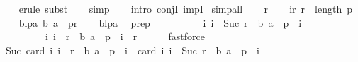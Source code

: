 \begin{isabellebody}
\ \ \isamarkupfalse%
\ {\isacharparenleft}{\kern0pt}erule\ subst{\isacharparenright}{\kern0pt}\isanewline
\ \ \isamarkupfalse%
\ {\isacharparenleft}{\kern0pt}simp{\isacharparenright}{\kern0pt}\isanewline
\ \ \isamarkupfalse%
\ {\isacharparenleft}{\kern0pt}intro\ conjI\ impI{\isacharparenright}{\kern0pt}\isanewline
{}\isamarkupfalse%
\ {\isacharparenleft}{\kern0pt}simp{\isacharunderscore}{\kern0pt}all{\isacharparenright}{\kern0pt}\isanewline
\ \ \isamarkupfalse%
\ r\isanewline
\ \ \isamarkupfalse%
\ ir{\isacharcolon}{\kern0pt}\ {\isachardoublequoteopen}r\ {\isacharless}{\kern0pt}\ length\ p{\isachardoublequoteclose}\isanewline
\ \ \isamarkupfalse%
\ blpa{\isacharcolon}{\kern0pt}\ {\isachardoublequoteopen}{\isacharparenleft}{\kern0pt}b{\isacharcomma}{\kern0pt}\ a{\isacharparenright}{\kern0pt}\ {\isasymin}\ p{\isacharbang}{\kern0pt}r{\isachardoublequoteclose}\isanewline
\ \ \isamarkupfalse%
\ blpa\ \isamarkupfalse%
\ prep{\isacharcolon}{\kern0pt}\ \isanewline
\ \ \ \ \ \ \ \ \ {\isachardoublequoteopen}{\isacharbraceleft}{\kern0pt}i{\isachardot}{\kern0pt}\ i\ {\isacharless}{\kern0pt}\ Suc\ r\ {\isasymand}\ {\isacharparenleft}{\kern0pt}b{\isacharcomma}{\kern0pt}\ a{\isacharparenright}{\kern0pt}\ {\isasymin}\ p\ {\isacharbang}{\kern0pt}\ i{\isacharbraceright}{\kern0pt}\ \isanewline
\ \ \ \ \ \ \ \ {\isacharequal}{\kern0pt}\ {\isacharbraceleft}{\kern0pt}i{\isachardot}{\kern0pt}\ i\ {\isacharless}{\kern0pt}\ r\ {\isasymand}\ {\isacharparenleft}{\kern0pt}b{\isacharcomma}{\kern0pt}\ a{\isacharparenright}{\kern0pt}\ {\isasymin}\ p\ {\isacharbang}{\kern0pt}\ i{\isacharbraceright}{\kern0pt}\ {\isasymunion}\ {\isacharbraceleft}{\kern0pt}r{\isacharbraceright}{\kern0pt}{\isachardoublequoteclose}\isanewline
\ \ \ \ \isamarkupfalse%
\ fastforce\isanewline
\ \ \isamarkupfalse%
\ {\isachardoublequoteopen}Suc\ {\isacharparenleft}{\kern0pt}card\ {\isacharbraceleft}{\kern0pt}i{\isachardot}{\kern0pt}\ i\ {\isacharless}{\kern0pt}\ r\ {\isasymand}\ {\isacharparenleft}{\kern0pt}b{\isacharcomma}{\kern0pt}\ a{\isacharparenright}{\kern0pt}\ {\isasymin}\ p\ {\isacharbang}{\kern0pt}\ i{\isacharbraceright}{\kern0pt}{\isacharparenright}{\kern0pt}\ {\isacharequal}{\kern0pt}\ card\ {\isacharbraceleft}{\kern0pt}i{\isachardot}{\kern0pt}\ i\ {\isacharless}{\kern0pt}\ Suc\ r\ {\isasymand}\ {\isacharparenleft}{\kern0pt}b{\isacharcomma}{\kern0pt}\ a{\isacharparenright}{\kern0pt}\ {\isasymin}\ p\ {\isacharbang}{\kern0pt}\ i{\isacharbraceright}{\kern0pt}{\isachardoublequoteclose}\isanewline

\end{isabellebody}
